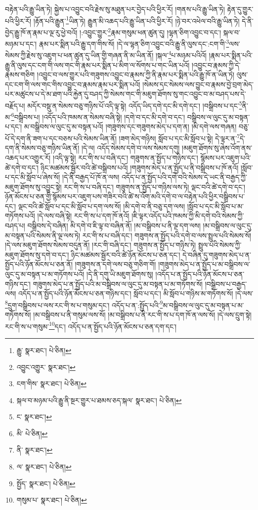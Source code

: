 བརྟེན་པའི་རྒྱུ་ཡིན་ཏེ། སྐྱེས་པ་འབྱུང་བའི་རྗེས་སུ་མཐུན་པར་བྱེད་པའི་ཕྱིར་རོ། །གནས་པའི་རྒྱུ་ཡིན་ཏེ། རྟེན་དུ་གྱུར་པའི་ཕྱིར་རོ། །རྟོན་པའི་རྒྱུན་\footnote{རྒྱུ་  སྣར་ཐང་།  པེ་ཅིན། }ཡིན་ཏེ། རྒྱུན་མི་འཆད་པའི་རྒྱུ་ཡིན་པའི་ཕྱིར་རོ། །ཉེ་བར་འཕེལ་བའི་རྒྱུ་ཡིན་ཏེ། དེ་ནི་བྱེད་རྒྱུ་ཁོ་ན་རྣམ་པ་ལྔ་རུ་ཕྱེ་བའོ། །:འབྱུང་གྱུར་\footnote{འབྱུང་འགྱུར་  སྣར་ཐང་། }རྣམ་གསུམ་ཕན་ཚུན་དུ། །ལྷན་ཅིག་འབྱུང་བ་དང་། སྐལ་བ་མཉམ་པ་དང་། རྣམ་པར་སྨིན་པའི་རྒྱུ་དག་གིས་སོ། །དེ་ལ་ལྷན་ཅིག་འབྱུང་བའི་རྒྱུ་ནི་ལུས་དང་:ངག་གི་\footnote{ངག་གིས་  སྣར་ཐང་།  པེ་ཅིན། }ལས་སེམས་ཀྱི་རྗེས་སུ་འཇུག་པ་ཕན་ཚུན་དུ་ཡིན་གྱི་གཞན་ནི་མ་ཡིན་ནོ། །སྐལ་\footnote{སྐལ་བ་མཉམ་པའི་རྒྱུ་ནི་སྔར་གྱུར་པ་ཐམས་ཅད་སྐལ་  སྣར་ཐང་།  པེ་ཅིན། }པ་མཉམ་པའིའོ། །རྣམ་པར་སྨིན་པའི་རྒྱུ་ནི་ལུས་དང་ངག་གི་ལས་གང་གི་རྣམ་པར་སྨིན་པ་མིག་ལ་སོགས་པ་གང་ཡིན་པའོ། །འབྱུང་བ་རྣམས་ཀྱི་དེ་རྣམས་གཅིག །འབྱུང་བ་ལས་གྱུར་པའི་གཟུགས་འབྱུང་བ་རྣམས་ཀྱི་ནི་རྣམ་པར་སྨིན་པའི་རྒྱུ་ཁོ་ན་ཡིན་ཏེ། ལུས་དང་ངག་གི་ལས་གང་གིས་འབྱུང་བ་རྣམས་རྣམ་པར་སྨིན་པའོ། །སེམས་དང་སེམས་ལས་བྱུང་བ་རྣམས་བྱེ་བྲག་མེད་པར་མཚུངས་པ་དེ་མ་ཐག་པའི་རྐྱེན་དུ་བཤད་ཀྱི་སེམས་གང་གི་མཇུག་ཐོགས་སུ་གང་འབྱུང་བ་མ་བཤད་པས་དེ་བརྗོད་པ། མདོར་བསྡུ་ན་སེམས་བཅུ་གཉིས་པོ་འདི་ལྟ་སྟེ། འདོད་ཡིད་དགེ་དང་མི་དགེ་དང་། །བསྒྲིབས་པ་དང་\footnote{ང་  སྣར་ཐང་། }ནི་མ་\footnote{མི་  པེ་ཅིན། }བསྒྲིབས་པ། །འདོད་པའི་ཁམས་ན་སེམས་བཞི་སྟེ། །དགེ་བ་དང་མི་དགེ་བ་དང་། བསྒྲིབས་ལ་ལུང་དུ་མ་བསྟན་པ་དང་། མ་བསྒྲིབས་ལ་ལུང་དུ་མ་བསྟན་པའོ། །གཟུགས་དང་གཟུགས་མེད་པ་དག་ན། །མི་དགེ་ལས་གཞན། བཅུ་པོ་དེ་དག་ནི་ཟག་པ་དང་བཅས་པའི་སེམས་ཡིན་ནོ། །ཟག་མེད་གཉིས། སློབ་པ་དང་མི་སློབ་པ་སྟེ། དེ་ལྟར་ན་\footnote{ནི་  སྣར་ཐང་། }དེ་དག་ནི་སེམས་བཅུ་གཉིས་ཡིན་ནོ། །དེ་ལ། འདོད་སེམས་དགེ་བ་ལས་སེམས་དགུ། །མཇུག་ཐོགས་སུ་ཞེས་འོག་ནས་འཆད་པར་འགྱུར་རོ། །འདི་ལྟ་སྟེ། རང་གི་ས་པ་བཞི་དང་། གཟུགས་ན་སྤྱོད་པ་གཉིས་དང་། སྙོམས་པར་འཇུག་པའི་ཚེ་དགེ་བ་དང་། ཉིང་མཚམས་སྦྱོར་བའི་ཚེ་བསྒྲིབས་པའོ། །གཟུགས་མེད་པ་ན་སྤྱོད་པ་ནི་བསྒྲིབས་པ་ཁོ་ནའོ། །སློབ་པ་དང་མི་སློབ་པ་ཞེས་སོ། །དེ་ནི་བརྒྱད་པོ་ཁོ་ན་ལས། འདོད་པ་ན་སྤྱོད་པའི་དགེ་བའི་སེམས་དེ་ཡང་ནི་བརྒྱད་ཀྱི་མཇུག་ཐོགས་སུ་འབྱུང་སྟེ། རང་གི་ས་པ་བཞི་དང་། གཟུགས་ན་སྤྱོད་པ་གཉིས་ལས་ཏེ། ལྡང་བའི་ཚེ་དགེ་བ་དང་། ཉོན་མོངས་པ་ཅན་གྱི་སྙོམས་པར་འཇུག་པས་གཟིར་བའི་ཚེ་ས་འོག་མའི་དགེ་བ་ལ་བརྟེན་པའི་ཕྱིར་བསྒྲིབས་པ་དང་། ལྡང་བའི་ཚེ་སློབ་པ་དང་མི་སློབ་པ་དག་ལས་སོ། །མི་དགེ་བ་ནི་བཅུ་དག་ལས། །སློབ་པ་དང་མི་སློབ་པ་མ་གཏོགས་པའོ། །དེ་ལས་བཞི་སྟེ། རང་གི་ས་པ་དག་ཁོ་ནའོ། །ཇི་ལྟར་འདོད་པའི་ཁམས་ཀྱི་མི་དགེ་བའི་སེམས་ཀྱི་བཤད་པ། བསྒྲིབས་དེ་བཞིན། མི་དགེ་བ་ཇི་ལྟ་བ་བཞིན་ནོ། །མ་བསྒྲིབས་པ་ནི་ལྔ་དག་ལས། །མ་བསྒྲིབས་ལ་ལུང་དུ་མ་བསྟན་པའི་སེམས་ནི་ལྔ་ལས་ཏེ། རང་གི་ས་པ་བཞི་དང་། གཟུགས་ན་སྤྱོད་པའི་དགེ་བ་ལས་སྤྲུལ་པའི་སེམས་སོ། །དེ་ལས་མཇུག་ཐོགས་སེམས་བདུན་ནོ། །རང་གི་བཞི་དང་། གཟུགས་ན་སྤྱོད་པ་གཉིས་ཏེ། སྤྲུལ་པའི་སེམས་ཀྱི་མཇུག་ཐོགས་སུ་དགེ་བ་དང་། ཉིང་མཚམས་སྦྱོར་བའི་ཚེ་ཉོན་མོངས་པ་ཅན་དང་། དེ་བཞིན་དུ་གཟུགས་མེད་པ་ན་སྤྱོད་པའི་ཉོན་མོངས་པ་ཅན་ནོ། །གཟུགས་ན་དགེ་ལས་བཅུ་གཅིག་གོ། །གཟུགས་མེད་པ་ན་སྤྱོད་པ་མ་བསྒྲིབས་ལ་ལུང་དུ་མ་བསྟན་པ་མ་གཏོགས་པའོ། །དེ་ནི་དགུ་ཡི་མཇུག་ཐོགས་སུ། །འདོད་པ་ན་སྤྱོད་པའི་ཉོན་མོངས་པ་ཅན་གཉིས་དང་། གཟུགས་མེད་པ་ན་སྤྱོད་པའི་མ་བསྒྲིབས་ལ་ལུང་དུ་མ་བསྟན་པ་མ་གཏོགས་སོ། །བསྒྲིབས་པ་བརྒྱད་ལས། འདོད་པ་ན་སྤྱོད་པའི་ཉོན་མོངས་པ་ཅན་གཉིས་དང་། སློབ་པ་དང་། མི་སློབ་པ་གཉིས་མ་གཏོགས་སོ། །དེ་ལས་\footnote{ལ་  སྣར་ཐང་།  པེ་ཅིན། }དྲུག་བསྒྲིབས་པ་ལས་རང་གི་ས་པ་གསུམ་དང་། འདོད་པ་ན་:སྤྱོད་པའི་\footnote{སྤྱོད་  སྣར་ཐང་།  པེ་ཅིན། }མ་བསྒྲིབས་ལ་ལུང་དུ་མ་བསྟན་པ་མ་གཏོགས་སོ། །མ་བསྒྲིབས་པ་ནི་གསུམ་ལས་སོ། །མ་བསྒྲིབས་པ་ནི་རང་གི་ས་པ་དག་ཁོ་ན་ལས་སོ། །དེ་ལས་དྲུག་སྟེ། རང་གི་ས་པ་གསུམ་\footnote{གསུམ་པ་  སྣར་ཐང་།  པེ་ཅིན། }དང་། འདོད་པ་ན་སྤྱོད་པའི་ཉོན་མོངས་པ་ཅན་དག་དང་། 